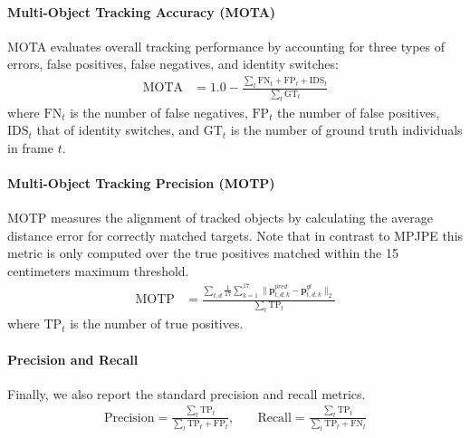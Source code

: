 \paragraph{Multi-Object Tracking Accuracy (MOTA)}
MOTA evaluates overall tracking performance by accounting for three types of errors, false positives, false negatives, and identity switches:
\begin{align*}
    \text{MOTA} &= 1.0 - \frac{\sum_{t} \text{FN}_t + \text{FP}_t + \text{IDS}_t}{\sum_{t} \text{GT}_t}
\end{align*}
where $\text{FN}_t$ is the number of false negatives, $\text{FP}_t$ the number of false positives, $\text{IDS}_t$ that of identity switches, and $\text{GT}_t$ is the number of ground truth individuals in frame $t$.

\paragraph{Multi-Object Tracking Precision (MOTP)}
MOTP measures the alignment of tracked objects by calculating the average distance error for correctly matched targets. Note that in contrast to MPJPE this metric is only computed over the true positives matched within the 15 centimeters maximum threshold.
\begin{align*}
    \text{MOTP} &= \frac{\sum_{t,d} \frac{1}{17} \sum_{k=1}^{17} \|\mathbf{p}_{t,d,k}^{pred} - \mathbf{p}_{t,d,k}^{gt}\|_2}{\sum_{t} \text{TP}_t}
\end{align*}
where $\text{TP}_t$ is the number of true positives.

\paragraph{Precision and Recall}
Finally, we also report the standard precision and recall metrics.
\begin{align*}
    \text{Precision} = \frac{\sum_t \text{TP}_t}{\sum_t \text{TP}_t + \text{FP}_t}, &\quad \text{Recall} = \frac{\sum_t \text{TP}_t}{\sum_t \text{TP}_t + \text{FN}_t}
\end{align*}
